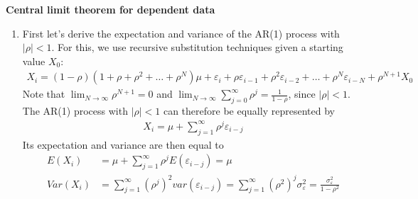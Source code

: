 \documentclass{article}
\begin{document}
\begin{solution}
\textbf{Central limit theorem for dependent data}

\begin{enumerate}
  \item First let's derive the expectation and variance of the AR(1) process with $|\rho|<1$. For this, we use recursive substitution techniques given a starting value $X_0$:
    \begin{align*}
      X_i = (1-\rho)(1+\rho+\rho^2+\dots+\rho^N)\mu + \varepsilon_i + \rho \varepsilon_{i-1} + \rho^2 \varepsilon_{i-2} + \dots + \rho^N \varepsilon_{i-N} + \rho^{N+1} X_0
    \end{align*}
    Note that $\lim_{N\rightarrow \infty} \rho^{N+1} = 0$ and $\lim_{N\rightarrow \infty} \sum_{j=0}^\infty \rho^j = \frac{1}{1-\rho}$, since $|\rho|<1$. The AR(1) process with $|\rho|<1$ can therefore be equally represented by
    \begin{align*}
    X_i = \mu + \sum_{j=1}^\infty \rho^j \varepsilon_{i-j}
    \end{align*}
    Its expectation and variance are then equal to
    \begin{align*}
    E(X_i) &= \mu + \sum_{j=1}^\infty \rho^j E(\varepsilon_{i-j}) = \mu\\
    Var(X_i) &= \sum_{j=1}^\infty (\rho^j)^2 var(\varepsilon_{i-j}) = \sum_{j=1}^\infty (\rho^2)^j \sigma_\varepsilon^2 = \frac{\sigma_\varepsilon^2}{1-\rho^2}
    \end{align*}


\end{enumerate}
\end{solution}
\end{document}
